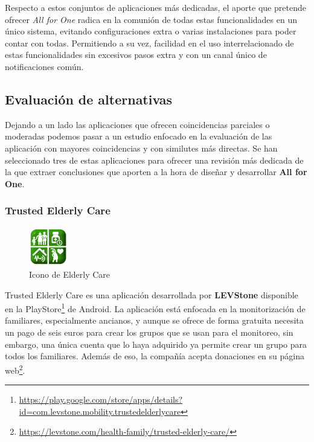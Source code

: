 Respecto a estos conjuntos de aplicaciones más dedicadas, el aporte que pretende ofrecer \emph{All for One} radica en la comunión de todas estas funcionalidades en un único sistema, evitando configuraciones extra o varias instalaciones para poder contar con todas. Permitiendo a su vez, facilidad en el uso interrelacionado de estas funcionalidades sin excesivos pasos extra y con un canal único de notificaciones común.

\subsection{Evaluación de alternativas}

Dejando a un lado las aplicaciones que ofrecen coincidencias parciales o moderadas podemos pasar a un estudio enfocado en la evaluación de las aplicación con mayores coincidencias y con similutes más directas. Se han seleccionado tres de estas aplicaciones para ofrecer una revisión más dedicada de la que extraer conclusiones que aporten a la hora de diseñar y desarrollar \textbf{All for One}.

\subsubsection{Trusted Elderly Care}

\begin{figure}
    \vspace{-20pt}
    \centering
    \includegraphics[width=0.15\textwidth]{images/Introduccion/elderly-icon.png}
    \vspace{-17pt}
    \caption{Icono de Elderly Care}
\end{figure}

Trusted Elderly Care es una aplicación desarrollada por \textbf{LEVStone} disponible en la PlayStore\footnote{\href{https://play.google.com/store/apps/details?id=com.levstone.mobility.trustedelderlycare}{https://play.google.com/store/apps/details?id=com.levstone.mobility.trustedelderlycare}} de Android. La aplicación está enfocada en la monitorización de familiares, especialmente ancianos, y aunque se ofrece de forma gratuita necesita un pago de seis euros para crear los grupos que se usan para el monitoreo, sin embargo, una única cuenta que lo haya adquirido ya permite crear un grupo para todos los familiares. Además de eso, la compañía acepta donaciones en su página web\footnote{\href{https://levstone.com/health-family/trusted-elderly-care/}{https://levstone.com/health-family/trusted-elderly-care/}}.

